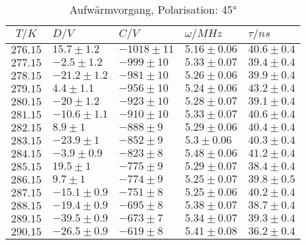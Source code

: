 \begin{table}[h!]
\footnotesize\centering
\begin{tabular}{|c|l|l|l|l|}
\hline
$T/K$&$D/V$&$C/V$&$\omega/MHz$&$\tau/ns$\\\hline\hline
$276.15$&$15.7\pm1.2$&$-1018\pm11$&$5.16\pm0.06$&$40.6\pm0.4$\\\hline
$277.15$&$-2.5\pm1.2$&$-999\pm10$&$5.33\pm0.07$&$39.4\pm0.4$\\\hline
$278.15$&$-21.2\pm1.2$&$-981\pm10$&$5.26\pm0.06$&$39.9\pm0.4$\\\hline
$279.15$&$4.4\pm1.1$&$-956\pm10$&$5.24\pm0.06$&$43.2\pm0.4$\\\hline
$280.15$&$-20\pm1.2$&$-923\pm10$&$5.28\pm0.07$&$39.1\pm0.4$\\\hline
$281.15$&$-10.6\pm1.1$&$-910\pm10$&$5.33\pm0.07$&$40.6\pm0.4$\\\hline
$282.15$&$8.9\pm1$&$-888\pm9$&$5.29\pm0.06$&$40.4\pm0.4$\\\hline
$283.15$&$-23.9\pm1$&$-852\pm9$&$5.3\pm0.06$&$40.3\pm0.4$\\\hline
$284.15$&$-3.9\pm0.9$&$-823\pm8$&$5.48\pm0.06$&$41.2\pm0.4$\\\hline
$285.15$&$19.5\pm1$&$-775\pm9$&$5.29\pm0.07$&$38.4\pm0.4$\\\hline
$286.15$&$9.7\pm1$&$-774\pm9$&$5.25\pm0.07$&$39.8\pm0.5$\\\hline
$287.15$&$-15.1\pm0.9$&$-751\pm8$&$5.25\pm0.06$&$40.2\pm0.4$\\\hline
$288.15$&$-19.4\pm0.9$&$-695\pm8$&$5.38\pm0.07$&$38.7\pm0.4$\\\hline
$289.15$&$-39.5\pm0.9$&$-673\pm7$&$5.34\pm0.07$&$39.3\pm0.4$\\\hline
$290.15$&$-26.5\pm0.9$&$-619\pm8$&$5.41\pm0.08$&$36.2\pm0.4$\\\hline
\end{tabular}
\caption{Aufwärmvorgang, Polarisation: 45°\label{warm45}}
\end{table}

